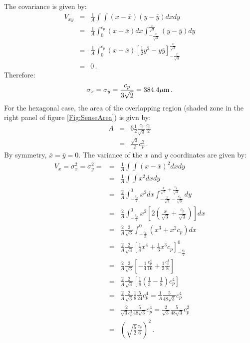 The covariance is given by:
\begin{eqnarray}
  V_{xy} &=& \frac{1}{A} \int \int (x-\bar{x}) (y-\bar{y}) dx dy         \\
        &=& \frac{1}{A} \int_{0}^{c_p} (x-\bar{x}) dx
            \int_{-\frac{x}{\sqrt{3}}}^{\frac{x}{\sqrt{3}}}(y-\bar{y}) dy     \\
        &=& \frac{1}{A} \int_{0}^{c_p} (x-\bar{x})
            \left[ 
              \frac{1}{2}y^2 - y \bar{y} 
            \right]_{-\frac{x}{\sqrt{3}}}^{\frac{x}{\sqrt{3}}}                \\
        &=& 0 \, .
\end{eqnarray}
Therefore: 
\begin{equation}
  \sigma_{x}=\sigma_{y}=\frac{c_p}{3\sqrt{2}} = 384.4 \mu{\rm m} \, .
\end{equation}
For the hexagonal case, the area of the overlapping region (shaded
zone in the right panel of figure \ref{Fig:SenseArea}) is givn by:
\begin{eqnarray}
  A & = & 6 \frac{1}{2} \frac{c_p}{\sqrt{3}} \frac{c_p}{2} \\
    & = & \frac{\sqrt{3}}{2}c_p^{2} \, .
\end{eqnarray}
By symmetry, $\bar{x} = \bar{y} = 0$.
The variance of the $x$ and $y$ coordinates are given by:
\begin{eqnarray}
  V_x = \sigma^2_x = \sigma^2_y =
        &=& \frac{1}{A} \int \int (x-\bar{x})^{2} dx dy \\
        &=& \frac{1}{A} \int \int x^{2} dx dy \\
        &=& \frac{2}{A}  \int_{-\frac{c_p}{2}}^{0}x^{2} dx 
            \int_{-\frac{x}{\sqrt{3}}-\frac{c_p}{\sqrt{3}}}
                ^{\frac{x}{\sqrt{3}}+\frac{c_p}{\sqrt{3}}} dy \nonumber \\
        &=& \frac{2}{A}\int_{-\frac{c_p}{2}}^{0}x^{2} 
            \left[ 2 \left( \frac{x}{\sqrt{3}}+\frac{c_p}{\sqrt{3}}  
            \right) \right] dx \\
        &=& \frac{2}{A}\frac{2}{\sqrt{3}} \int_{-\frac{c_p}{2}}^{0} 
            \left( x^{3}+ x^{2}c_p \right)dx \nonumber \\
        &=& \frac{2}{A}\frac{2}{\sqrt{3}} \left[ \frac{1}{4}
            x^4 +\frac{1}{3} x^3 c_p\right]_{-\frac{c_p}{2}}^{0} \\
        &=& \frac{2}{A}\frac{2}{\sqrt{3}} \left[ -\frac{1}{4}
            \frac{c_p^{4}}{16}+\frac{1}{3}\frac{c_p^{4}}{8}\right] \\
        &=& \frac{2}{A}\frac{2}{\sqrt{3}}
            \left[ \frac{1}{8} \left( \frac{1}{3}-\frac{1}{8} 
            \right) c_p^4 \right]\\
        &=& \frac{2}{A}\frac{2}{\sqrt{3}} \frac{1}{8} \frac{5}{24} c_p^4
         =  \frac{1}{A} \frac{5}{48\sqrt{3}} c_p^4 \\
        &=& \frac{2}{\sqrt{3}c_p^{2}} \frac{5}{48\sqrt{3}} c_p^4 
         =  \frac{2}{\sqrt{3}} \frac{5}{48\sqrt{3}} c_p^2 \\
        &=& \left( \sqrt{\frac{5}{2}}\frac{c_p}{6} \right)^2 \, .
\end{eqnarray}
